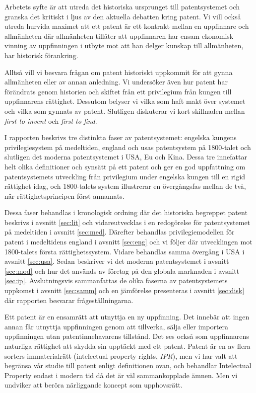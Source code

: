 Arbetets syfte är att utreda det historiska ursprunget till patentsystemet och
granska det kritiskt i ljus av den aktuella debatten kring patent.
Vi vill också utreda hurvida maximet att ett patent är ett kontrakt mellan en
uppfinnare och allmänheten där allmänheten tillåter att uppfinnaren har ensam
ekonomisk vinning av uppfinningen i utbyte mot att han delger kunskap till
allmänheten, har historisk förankring.

Alltså vill vi besvara frågan om patent historiskt uppkommit för att gynna
allmänheten eller av annan anledning. Vi undersöker även hur patent har förändrats genom historien och skiftet från ett privilegium från kungen till uppfinnarens rättighet.
Dessutom belyser vi vilka som haft makt över systemet och vilka som gynnats av patent.
Slutligen diskuterar vi kort skillnaden mellan \emph{first to invent} och \emph{first to find}.
 
I rapporten beskrivs tre distinkta faser av patentsystemet: engelska kungens privilegiesystem på medeltiden, england och usas patentsystem på 1800-talet och slutligen det moderna patentsystemet i USA, Eu och Kina. Dessa tre innefattar helt olika definitioner och synsätt på ett patent och ger en god uppfattning om patentsystemets utveckling från privilegium under engelska kungen till en rigid rättighet idag, och 1800-talets system illustrerar en övergångsfas mellan de två, när rättighetsprincipen först annamats. 

Dessa faser behandlas i kronologisk ordning där det historiska begreppet patent beskrivs i avsnitt \ref{sec:lit} och vidareutvecklas i en redogörelse för patentsystemet på medeltiden i avsnitt \ref{sec:med}. Därefter behandlas privilegiemodellen för patent i medeltidens england i avsnitt \ref{sec:eng} och vi följer där utvecklingen mot 1800-talets första rättighetssystem. Vidare behandlas samma övergång i USA i avsnitt \ref{sec:usa}. Sedan beskriver vi det moderna patentsystemet i avsnitt \ref{sec:mod} och hur det används av företag på den globala marknaden i avsnitt \ref{sec:ip}. Avslutningsvis sammanfattas de olika faserna av patentsystemets uppkomst i avsnitt \ref{sec:samm} och en jämförelse presenteras i avsnitt \ref{sec:disk} där rapporten besvarar frågeställningarna.
 

 
 Ett patent är en ensamrätt att utnyttja en ny uppfinning. Det innebär att ingen
 annan får utnyttja uppfinningen genom att tillverka, sälja eller importera 
 uppfinningen utan patentinnehavarens tillstånd. Det ses också som uppfinnarens naturliga rättighet att skydda sin upptäckt med ett patent. Patent är en av flera sorters
 immaterialrätt (intelectual property rights, \emph{IPR}), men vi har valt att begränsa vår studie till patent enligt
 definitionen ovan, och behandlar Intelectual Property endast i modern tid då det är väl sammankopplade ämnen. Men vi undviker att beröra närliggande koncept som upphovsrätt.

